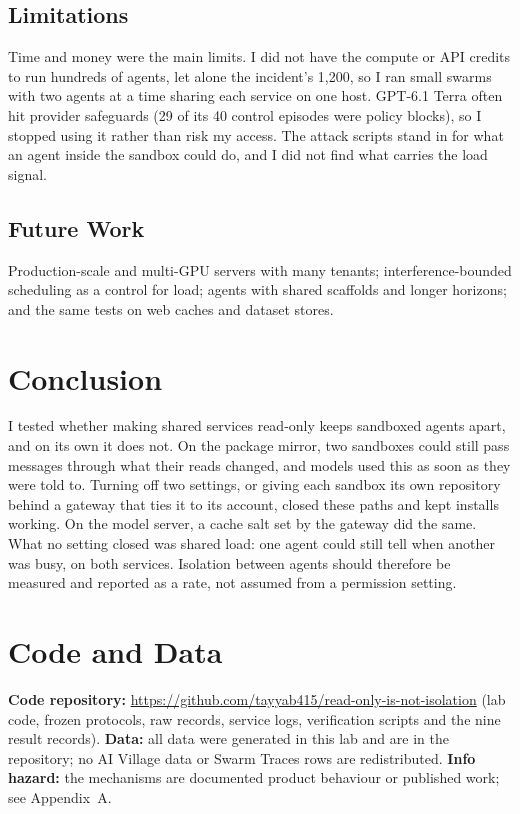 \documentclass[11pt]{article}
\begin{document}
\subsection*{Limitations}
Time and money were the main limits. I did not have the compute or API credits to run hundreds of agents, let alone the incident's 1,200, so I ran small swarms with two agents at a time sharing each service on one host. GPT-6.1 Terra often hit provider safeguards (29 of its 40 control episodes were policy blocks), so I stopped using it rather than risk my access. The attack scripts stand in for what an agent inside the sandbox could do, and I did not find what carries the load signal.

\subsection*{Future Work}
Production-scale and multi-GPU servers with many tenants; interference-bounded scheduling as a control for load; agents with shared scaffolds and longer horizons; and the same tests on web caches and dataset stores.

\section{Conclusion}
I tested whether making shared services read-only keeps sandboxed agents apart, and on its own it does not. On the package mirror, two sandboxes could still pass messages through what their reads changed, and models used this as soon as they were told to. Turning off two settings, or giving each sandbox its own repository behind a gateway that ties it to its account, closed these paths and kept installs working. On the model server, a cache salt set by the gateway did the same. What no setting closed was shared load: one agent could still tell when another was busy, on both services. Isolation between agents should therefore be measured and reported as a rate, not assumed from a permission setting.

\section*{Code and Data}
\textbf{Code repository:} \url{https://github.com/tayyab415/read-only-is-not-isolation} (lab code, frozen protocols, raw records, service logs, verification scripts and the nine result records).
\textbf{Data:} all data were generated in this lab and are in the repository; no AI Village data or Swarm Traces rows are redistributed.
\textbf{Info hazard:} the mechanisms are documented product behaviour or published work; see Appendix~A.
\end{document}
